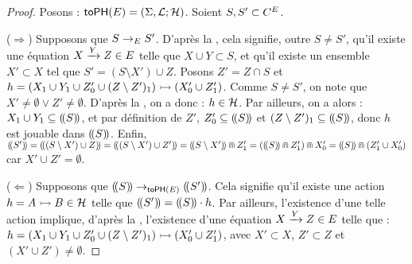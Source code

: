 \begin{proof}
  Posons : $\mathsf{toPH}(E) = (\Sigma, \mathcal{L}; \mathcal{H})$.
  Soient $S, S' \subset C^{E}$.
  
  ($\Rightarrow$) Supposons que $S \rightarrow_{E} S'$.
    D'après la ,
    cela signifie, outre $S \neq S'$,
    qu'il existe une équation $X \xrightarrow{Y} Z \in E$
    telle que $X \cup Y \subset S$,
    et qu'il existe un ensemble $X' \subset X$ tel que $S' = (S \setminus X') \cup Z$.
    Posons $Z' = Z \cap S$
    et $h = \mbox{$(X_1 \cup Y_1 \cup Z'_0 \cup (Z \setminus Z')_1) \rightarrowtail (X'_0 \cup Z'_1)$}$.
    Comme $S \neq S'$, on note que $X' \neq \emptyset \vee Z' \neq \emptyset$.
    D'après la , on a donc : $h \in \mathcal{H}$.
    Par ailleurs, on a alors : $X_1 \cup Y_1 \subseteq (\!(S)\!)$,
    et par définition de $Z'$, $Z'_0 \subseteq (\!(S)\!)$
    et $(Z \setminus Z')_1 \subseteq (\!(S)\!)$,
    donc $h$ est jouable dans $(\!(S)\!)$.
    Enfin, $\tophm{S'} = \tophm{(S \setminus X') \cup Z} = \tophm{(S \setminus X') \cup Z'} =
      \tophm{S \setminus X'} \recouvre Z'_1 = (\tophm{S} \recouvre Z'_1) \recouvre X'_0 =
      \tophm{S} \recouvre (Z'_1 \cup X'_0)$
    car $X' \cup Z' = \emptyset$.
  
  ($\Leftarrow$) Supposons que $(\!(S)\!) \rightarrow_{\mathsf{toPH}(E)} (\!(S')\!)$.
    Cela signifie qu'il existe une action $h = \mbox{$A \rightarrowtail B$} \in \mathcal{H}$
    telle que $(\!(S')\!) = (\!(S)\!) \cdot h$.
    Par ailleurs, l'existence d'une telle action implique, d'après la ,
    l'existence d'une équation $X \xrightarrow{Y} Z \in E$ telle que :
    $h = \mbox{$(X_1 \cup Y_1 \cup Z'_0 \cup (Z \setminus Z')_1) \rightarrowtail (X'_0 \cup Z'_1)$}$,
    avec $X' \subset X$, $Z' \subset Z$ et $(X' \cup Z') \neq \emptyset$.
    
    \TODO
  
\end{proof}

